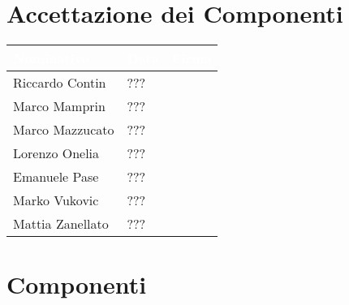 \section{Accettazione dei Componenti}

\begin{center}
  \centering
  \begin{longtable}{|C{3,5cm}|C{2cm}|C{6,5cm}|}
    \hline
    \textcolor[HTML]{FFFFFF}{\textbf{Nominativo}} & \textcolor[HTML]{FFFFFF}{\textbf{Data}} & \textcolor[HTML]{FFFFFF}{\textbf{Firma}} \\ \hline
    Riccardo Contin & ??? &  \\ \hline
    Marco Mamprin & ??? &  \\ \hline
    Marco Mazzucato & ??? &  \\ \hline
    Lorenzo Onelia & ??? &  \\ \hline
    Emanuele Pase & ??? &  \\ \hline
    Marko Vukovic & ??? &  \\ \hline
    Mattia Zanellato & ??? &  \\ \hline
  \end{longtable}
\end{center}

\section{Componenti}
\renewcommand\arraystretch{1,5}

